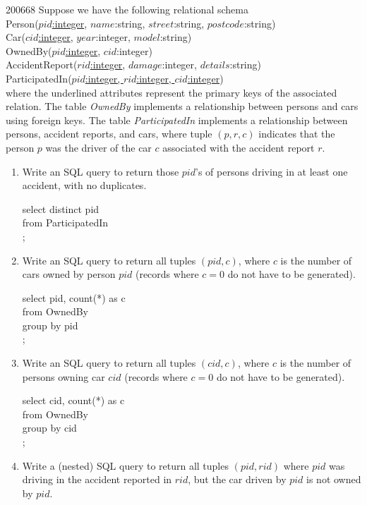 \documentclass[10pt,\jkfside,a4paper]{article}
\begin{document}
\begin{examquestion}{2006}{6}{8}
Suppose we have the following relational schema\\
Person(\underline{$pid$:integer}, $name$:string, $street$:string, $postcode$:string)\\
Car(\underline{$cid$:integer}, $year$:integer, $model$:string)\\
OwnedBy(\underline{$pid$:integer}, $cid$:integer)\\
AccidentReport(\underline{$rid$:integer}, $damage$:integer, $details$:string)\\
ParticipatedIn(\underline{$pid$:integer, $rid$:integer, $cid$:integer})\\
where the underlined attributes represent the primary keys of the associated
relation. The table \textit{OwnedBy} implements a relationship between persons and cars
using foreign keys. The table \textit{ParticipatedIn} implements a relationship between
persons, accident reports, and cars, where tuple $(p, r, c)$ indicates that the person
$p$ was the driver of the car $c$ associated with the accident report $r$.
\begin{enumerate}
\item{Write an SQL query to return those $pid$’s of persons driving in at least one
accident, with no duplicates.}

{\ttfamily
select distinct pid\\
from ParticipatedIn\\
;
}

\item{Write an SQL query to return all tuples $(pid, c)$, where $c$ is the number of cars
owned by person $pid$ (records where $c = 0$ do not have to be generated).}

{\ttfamily 
select pid, count(*) as c\\
from OwnedBy\\
group by pid\\
;
}

\item{Write an SQL query to return all tuples $(cid, c)$, where $c$ is the number of
persons owning car $cid$ (records where $c = 0$ do not have to be generated).}

{\ttfamily
select cid, count(*) as c\\
from OwnedBy\\
group by cid\\
;
}
\item{Write a (nested) SQL query to return all tuples $(pid, rid)$ where $pid$ was
driving in the accident reported in $rid$, but the car driven by $pid$ is not owned
by $pid$.}


\end{enumerate}
\end{examquestion}
\end{document}
